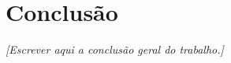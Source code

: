 \documentclass[12pt,a4paper]{article}
\begin{document}


\section{Conclusão}

%

\textit{[Escrever aqui a conclusão geral do trabalho.]}




\printbibliography




%
%

\end{document}
